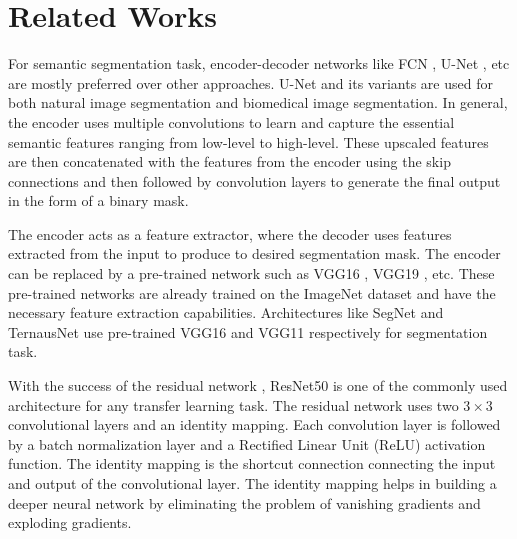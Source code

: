 \documentclass[sigconf]{acmart-me}
\begin{document}
\section{Related Works}
\label{sec:work}
For semantic segmentation task, encoder-decoder networks like FCN \cite{long2015fully}, U-Net \cite{ronneberger2015u}, etc are mostly preferred over other approaches. U-Net and its variants are used for both natural image segmentation and biomedical image segmentation. In general, the encoder uses multiple convolutions to learn and capture the essential semantic features ranging from low-level to high-level. These upscaled features are then concatenated with the features from the encoder using the skip connections and then followed by convolution layers to generate the final output in the form of a binary mask.

The encoder acts as a feature extractor,  where the decoder uses features extracted from the input to produce to desired segmentation mask. The encoder can be replaced by a pre-trained network such as VGG16 \cite{simonyan2014very}, VGG19 \cite{simonyan2014very},  etc. These pre-trained networks are already trained on the ImageNet \cite{russakovsky2015imagenet} dataset and have the necessary feature extraction capabilities. Architectures like SegNet \cite{badrinarayanan2017segnet} and TernausNet \cite{iglovikov2018ternausnet} use pre-trained VGG16 and VGG11 respectively for segmentation task. 

With the success of the residual network \cite{he2016deep}, ResNet50 is one of the commonly used architecture for any transfer learning task. The residual network uses two $3 \times 3$ convolutional layers and an identity mapping. Each convolution layer is followed by a batch normalization layer and a Rectified Linear Unit (ReLU) activation function. The identity mapping is the shortcut connection connecting the input and output of the convolutional layer. The identity mapping helps in building a deeper neural network by eliminating the problem of vanishing gradients and exploding gradients.
\end{document}
